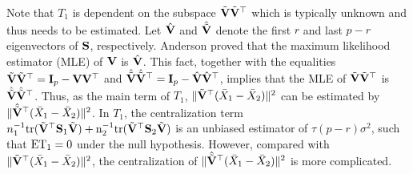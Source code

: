 \documentclass[times,sort&compress,3p]{elsarticle}
\newcommand{\mytr}{\rm tr}
\newcommand{\myE}{\rm E}
\theoremstyle{plain}
\theoremstyle{definition}
\newtheorem{remark}{\quad\quad Remark}
\theoremstyle{remark}
\begin{document}


Note that $T_1$ %
is dependent on the subspace $\tilde{\mathbf{V}}\tilde{\mathbf{V}}^\top $ which is typically unknown and thus needs to be estimated.
Let $\hat{\mathbf{V}}$ and $\hat{\tilde{\mathbf{V}}}$ denote the first $r$ and last $p-r$ eigenvectors of $\mathbf{S}$, respectively.
Anderson \cite{Anderson1986Asymptotic} proved that the maximum likelihood estimator (MLE) of $\mathbf{V}$ is $\hat{\mathbf{V}}$.
This fact, together with the equalities $\tilde{\mathbf{V}}\tilde{\mathbf{V}}^\top = \mathbf{I}_p-\mathbf{V}\mathbf{V}^\top $ and $\hat{\tilde{\mathbf{V}}}\hat{\tilde{\mathbf{V}}}^\top = \mathbf{I}_p-\hat{\mathbf{V}}\hat{\mathbf{V}}^\top $, implies that 
the MLE of $\tilde{\mathbf{V}}\tilde{\mathbf{V}}^\top $ is $\hat{\tilde{\mathbf{V}}}\hat{\tilde{\mathbf{V}}}^\top $.
Thus, as the main term of $T_1$,
$\|\tilde{\mathbf{V}}^\top  (\bar{X}_1-\bar{X}_2)\|^2$ can be estimated by $\|\hat{\tilde{\mathbf{V}}}^\top  (\bar{X}_1-\bar{X}_2)\|^2$.
In $T_1$, the centralization term $n_1^{-1}\mytr(\tilde{\BV}^\top  \BS_1\tilde{\BV})+n_2^{-1}\mytr(\tilde{\BV}^\top  \BS_2\tilde{\BV})$ is an unbiased estimator of $\tau (p-r)\sigma^2$, such that $\myE T_1=0$ under the null hypothesis.
However, compared with $\|\tilde{\mathbf{V}}^\top  (\bar{X}_1-\bar{X}_2)\|^2$, the centralization of $\|\hat{\tilde{\mathbf{V}}}^\top  (\bar{X}_1-\bar{X}_2)\|^2$ is more complicated.
\end{document}

